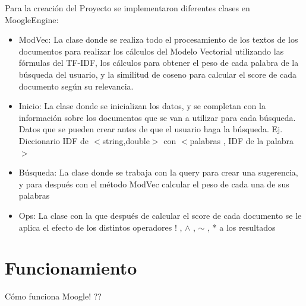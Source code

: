 \documentclass[12pt, a4paper]{article}
\begin{document}
Para la creación del Proyecto se implementaron diferentes clases en MoogleEngine:
\begin{itemize}
      \item ModVec: La clase donde se realiza todo el procesamiento de los textos de los documentos
            para realizar los cálculos del Modelo Vectorial utilizando las fórmulas del TF-IDF,
            los cálculos para obtener el peso de cada palabra de la búsqueda del usuario,
            y la similitud de coseno para calcular el score de cada documento según su relevancia.
      \item Inicio: La clase donde se inicializan los datos, y se completan con la información sobre
            los documentos que se van a utilizar para cada búsqueda. Datos que se pueden crear
            antes de que el usuario haga la búsqueda.
            Ej. Diccionario IDF de $<$string,double$>$ con $<$palabras , IDF de la palabra$>$
      \item Búsqueda: La clase donde se trabaja con la query para crear una sugerencia,
            y para después con el método ModVec calcular el peso de cada una de sus palabras
      \item Ops: La clase con la que después de calcular el score de
            cada documento se le aplica el efecto de los distintos operadores
            ! , $\wedge$ , $\sim$ , * a los resultados

\end{itemize}
\section{Funcionamiento}

Cómo funciona Moogle! ??
\end{document}
